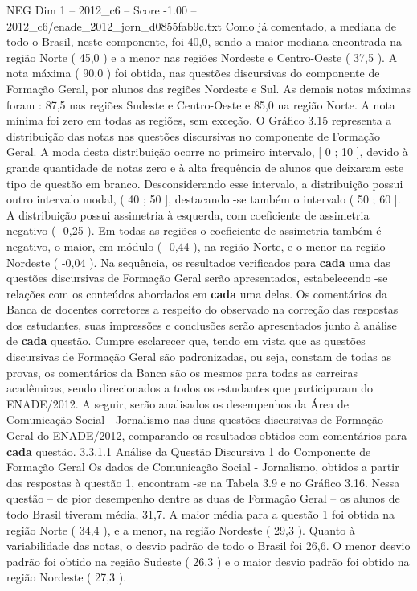 \begin{textsample}{NEG Dim 1 – 2012\_c6 – Score -1.00 – 2012\_c6/enade\_2012\_jorn\_d0855fab9c.txt}
Como já comentado, a mediana de todo o Brasil, neste componente, foi 40,0, sendo a maior mediana encontrada na região Norte ( 45,0 ) e a menor nas regiões Nordeste e Centro-Oeste ( 37,5 ).
A nota máxima ( 90,0 ) foi obtida, nas questões discursivas do componente de Formação Geral, por alunos das regiões Nordeste e Sul.
As demais notas máximas foram : 87,5 nas regiões Sudeste e Centro-Oeste e 85,0 na região Norte.
A nota mínima foi zero em todas as regiões, sem exceção.
O Gráfico 3.15 representa a distribuição das notas nas questões discursivas no componente de Formação Geral.
A moda desta distribuição ocorre no primeiro intervalo, [ 0 ; 10 ], devido à grande quantidade de notas zero e à alta frequência de alunos que deixaram este tipo de questão em branco.
Desconsiderando esse intervalo, a distribuição possui outro intervalo modal, ( 40 ; 50 ], destacando -se também o intervalo ( 50 ; 60 ].
A distribuição possui assimetria à esquerda, com coeficiente de assimetria negativo ( -0,25 ).
Em todas as regiões o coeficiente de assimetria também é negativo, o maior, em módulo ( -0,44 ), na região Norte, e o menor na região Nordeste ( -0,04 ).
Na sequência, os resultados verificados para \textbf{cada} uma das questões discursivas de Formação Geral serão apresentados, estabelecendo -se relações com os conteúdos abordados em \textbf{cada} uma delas.
Os comentários da Banca de docentes corretores a respeito do observado na correção das respostas dos estudantes, suas impressões e conclusões serão apresentados junto à análise de \textbf{cada} questão.
Cumpre esclarecer que, tendo em vista que as questões discursivas de Formação Geral são padronizadas, ou seja, constam de todas as provas, os comentários da Banca são os mesmos para todas as carreiras acadêmicas, sendo direcionados a todos os estudantes que participaram do ENADE/2012.
A seguir, serão analisados os desempenhos da Área de Comunicação Social - Jornalismo nas duas questões discursivas de Formação Geral do ENADE/2012, comparando os resultados obtidos com comentários para \textbf{cada} questão. 3.3.1.1 Análise da Questão Discursiva 1 do Componente de Formação Geral Os dados de Comunicação Social - Jornalismo, obtidos a partir das respostas à questão 1, encontram -se na Tabela 3.9 e no Gráfico 3.16.
Nessa questão – de pior desempenho dentre as duas de Formação Geral – os alunos de todo Brasil tiveram média, 31,7.
A maior média para a questão 1 foi obtida na região Norte ( 34,4 ), e a menor, na região Nordeste ( 29,3 ).
Quanto à variabilidade das notas, o desvio padrão de todo o Brasil foi 26,6.
O menor desvio padrão foi obtido na região Sudeste ( 26,3 ) e o maior desvio padrão foi obtido na região Nordeste ( 27,3 ).

\end{textsample}
